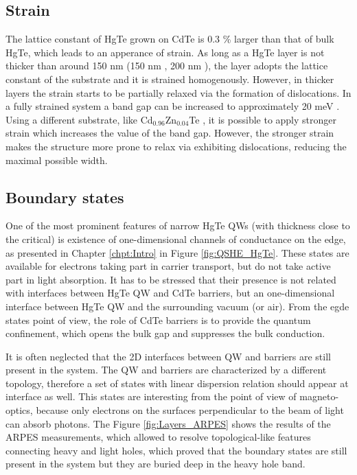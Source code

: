 \documentclass[titlepage,a4paper]{book}
\newcommand{\wciecie}{\quad\phantom{v}}
\begin{document}
\subsection{Strain}
\wciecie
The lattice constant of HgTe grown on CdTe is 0.3 \% larger than that of bulk HgTe, which leads to an apperance of strain. As long as a HgTe layer is not thicker than around 150 nm (150 nm \cite{Crauste_StrainedMCT}, 200 nm \cite{Brune_State2}), the layer adopts the lattice constant of the substrate and it is strained homogenously. However, in thicker layers the strain starts to be partially relaxed via the formation of dislocations. In a fully strained system a band gap can be increased to approximately 20 meV \cite{Brune_State2}\cite{Crauste_StrainedMCT}. Using a different substrate, like Cd$_{0.96}$Zn$_{0.04}$Te \cite{Leubner_State}, it is possible to apply stronger strain which increases the value of the band gap. However, the stronger strain makes the structure more prone to relax via exhibiting dislocations, reducing the maximal possible width.

\subsection{Boundary states}
\wciecie
One of the most prominent features of narrow HgTe QWs (with thickness close to the critical) is existence of one-dimensional channels of conductance on the edge, as presented in Chapter \ref{chpt:Intro} in Figure \ref{fig:QSHE_HgTe}. These states are available for electrons taking part in carrier transport, but do not take active part in light absorption. It has to be stressed that their presence is not related with interfaces between HgTe QW and CdTe barriers, but an one-dimensional interface between HgTe QW and the surrounding vacuum (or air). From the egde states point of view, the role of CdTe barriers is to provide the quantum confinement, which opens the bulk gap and suppresses the bulk conduction. 

It is often neglected that the 2D interfaces between QW and barriers are still present in the system. The QW and barriers are characterized by a different topology, therefore a set of states with linear dispersion relation should appear at interface as well. This states are interesting from the point of view of magneto-optics, because only electrons on the surfaces perpendicular to the beam of light can absorb photons. The Figure \ref{fig:Layers_ARPES} shows the results of the ARPES measurements, which allowed to resolve topological-like features connecting heavy and light holes, which proved that the boundary states are still present in the system but they are buried deep in the heavy hole band. 
\end{document}
